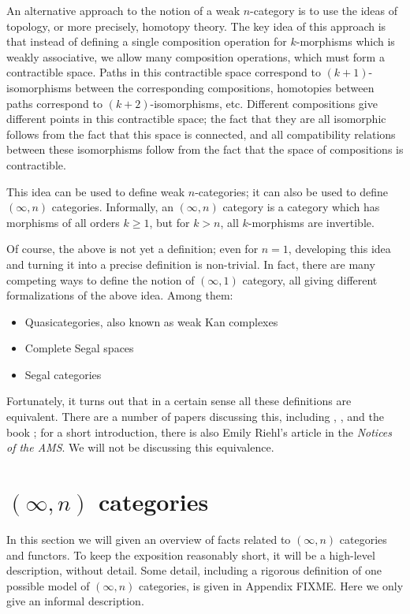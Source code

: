 An alternative approach to the notion of a weak $n$-category is to use the
ideas of topology, or more precisely, homotopy theory. The key idea of this
approach is that instead of defining a single composition operation for
$k$-morphisms which is weakly associative, we allow many composition
operations, which must form a contractible space. Paths in this contractible
space correspond to $(k+1)$-isomorphisms between the corresponding
compositions, homotopies between paths correspond to $(k+2)$-isomorphisms, etc.
Different compositions give different points in this contractible space; the
fact that they are all isomorphic follows from the fact that this space is
connected, and all compatibility relations between these isomorphisms follow
from the fact that the space of compositions is contractible.

This idea can be used to define weak $n$-categories; it can also be used to
define $(\infty, n)$ categories. Informally, an $(\infty, n)$ category is a
category which has morphisms of all orders $k \ge 1$, but for $k>n$, all
$k$-morphisms are invertible.


Of course, the above is not yet a definition; even for $n=1$, developing this
idea and turning it into a precise definition is non-trivial. In fact, there are
many competing ways to define the notion of $(\infty, 1)$ category, all giving
different formalizations of the above idea. Among them:

\begin{itemize}
  \item Quasicategories, also known as weak Kan complexes
  \item Complete Segal spaces
  \item Segal categories
\end{itemize}

Fortunately, it turns out that in a certain sense all these definitions are
equivalent. There are a number of papers discussing this, including
, , and the book ; for a short
introduction, there is also Emily Riehl's article  in the
\emph{Notices of the AMS}. We will not be discussing this equivalence.


\section{$(\infty, n)$ categories}
In this section we will given an overview of facts related to $(\infty, n)$
categories and functors. To keep the exposition reasonably short, it will be a
high-level description, without detail. Some detail, including a rigorous
definition of one possible model of $(\infty, n)$ categories, is given in
Appendix FIXME. Here we only give an informal description.

